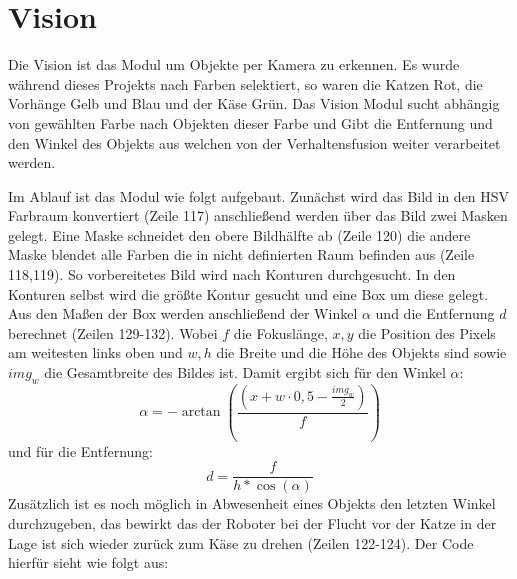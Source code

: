 \documentclass[11pt,a4paper]{article}
\begin{document}
\section{Vision}      
Die Vision ist das Modul um Objekte per Kamera zu erkennen. Es wurde während dieses Projekts nach Farben selektiert, so waren die Katzen Rot, die Vorhänge Gelb und Blau und der Käse Grün. Das Vision Modul sucht abhängig von gewählten Farbe nach Objekten dieser Farbe und Gibt die Entfernung und den Winkel des Objekts aus welchen von der Verhaltensfusion weiter verarbeitet werden.

 Im Ablauf ist das Modul wie folgt aufgebaut. Zunächst wird das Bild in den HSV Farbraum konvertiert (Zeile 117) anschließend werden über das Bild zwei Masken gelegt. Eine Maske schneidet den obere Bildhälfte ab (Zeile 120) die andere Maske blendet alle Farben die in nicht definierten Raum befinden aus (Zeile 118,119). So vorbereitetes Bild wird nach Konturen durchgesucht. In den Konturen selbst wird die größte Kontur gesucht und eine Box um diese gelegt. Aus den Maßen der Box werden anschließend der Winkel $\alpha$ und die Entfernung $d$ berechnet (Zeilen 129-132). Wobei $f$ die Fokuslänge, $x,y$ die Position des Pixels am weitesten links oben und $w,h$ die Breite und die Höhe des Objekts sind sowie $img_w$ die Gesamtbreite des Bildes ist. Damit ergibt sich für den Winkel $\alpha$:
\begin{equation}
\alpha = -\arctan(\frac{(x+w\cdot 0,5-\frac{img_w}{2})}{f})
\end{equation}   
und für die Entfernung:
\begin{equation}
d=\frac{f}{h*\cos(\alpha)}
\end{equation}
Zusätzlich ist es noch möglich in Abwesenheit eines Objekts den letzten Winkel durchzugeben, das bewirkt das der Roboter bei der Flucht vor der Katze in der Lage ist sich wieder zurück zum Käse zu drehen (Zeilen 122-124).
Der Code hierfür sieht wie folgt aus:
\end{document}
